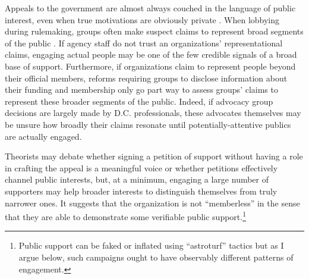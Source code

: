 Appeals to the government are almost always couched in the language of public interest, even when true motivations are obviously private \citep{Schattschneider1975}.
When lobbying during rulemaking, groups often make suspect claims to represent broad segments of the public \citep{Seifter2016UCLA}. %
If agency staff do not trust an organizations' representational claims, engaging actual people may be one of the few credible signals of a broad base of support. Furthermore, if organizations claim to represent people beyond their official members, reforms requiring groups to disclose information about their funding and membership \citep{Seifter2016UCLA} only go part way to assess groups' claims to represent these broader segments of the public. Indeed, if advocacy group decisions are largely made by D.C. professionals, these advocates themselves may be unsure how broadly their claims resonate until potentially-attentive publics are actually engaged.

 Theorists may debate whether signing a petition of support without having a role in crafting the appeal is a meaningful voice or whether petitions effectively channel public interests, but, at a minimum, engaging a large number of supporters may help broader interests to distinguish themselves from truly narrower ones. It suggests that the organization is not ``memberless'' \citep{Skocpol2003} in the sense that they are able to demonstrate some verifiable public support.\footnote{
Public support can be faked or inflated using ``astroturf'' tactics but as I argue below, such campaigns ought to have observably different patterns of engagement.}



